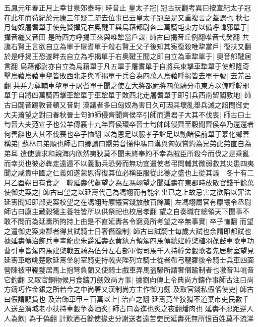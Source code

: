五鳳元年春正月上幸甘泉郊泰畤|{
	畤音止}
皇太子冠|{
	冠古玩翻考異曰按宣紀太子冠在此年而荀紀於元康三年疑二疏去位事已云皇太子冠至是又重複言之蓋誤也}
秋七月匈奴屠耆單于使先賢撣兄右奥鞬王與烏藉都尉各二萬騎屯東方以備呼韓邪單于|{
	撣音纒又音田}
是時西方呼揭王來與唯犂當戶謀|{
	師古曰揭音丘例翻唯音弋癸翻}
共讒右賢王言欲自立為單于屠耆單于殺右賢王父子後知其寃復殺唯犂當戶|{
	復扶又翻}
於是呼揭王恐遂畔去自立為呼揭單于右奧鞬王聞之即自立為車犂單于|{
	奧音郁鞬居言翻}
烏藉都尉亦自立為烏藉單于凡五單于屠耆單于自將兵東擊車犂單于使都隆奇擊烏藉烏藉車犂皆敗西北走與呼揭單于兵合為四萬人烏藉呼揭皆去單于號|{
	去羌呂翻}
共并力尊輔車犂單于屠耆單于聞之使左大將都尉將四萬騎分屯東方以備呼韓邪單于自將四萬騎西擊車犂單于車犂單于敗西北走屠耆單于即引兵西南留闒敦地|{
	師古曰闒音蹋敦音頓又音對}
漢議者多曰匈奴為害日久可因其壞亂舉兵滅之詔問御史大夫蕭望之對曰春秋晉士匄帥師侵齊聞齊侯卒引師而還君子大其不伐喪|{
	師古曰士匄晉大夫范宣子也公羊傳襄十九年齊侯環卒晉士匄帥師侵齊至穀聞齊侯卒乃還還者何善辭也大其不伐喪也卒子恤翻}
以為恩足以服孝子誼足以動諸侯前單于慕化鄉善稱弟|{
	蘇林曰弟順也師古曰郷讀曰嚮弟音悌仲馮曰漢與匈奴嘗約為兄弟此弟直自為弟耳}
遣使請求和親海内欣然夷狄莫不聞未終奉約不幸為賊臣所殺今而伐之是乘亂而幸災也彼必犇走遠遁不以義動兵恐勞而無功宜遣使者弔問輔其微弱救其災患四夷聞之咸貴中國之仁義如遂蒙恩得復其位必稱臣服從此德之盛也上從其議　冬十有二月乙酉朔日有食之　韓延夀代蕭望之為左馮翊望之聞延夀在東郡時放散官錢千餘萬使御史案之|{
	師古曰望之以延壽代己為馮翊而有能名出已之上故忌害之欲䧟以罪法}
延夀聞知即部吏案校望之在馮翊時廪犧官錢放散百餘萬|{
	左馮翊屬官有廪犧令丞尉師古曰廪主藏穀犧主養牲皆所以供祭祀也校居孝翻}
望之自奏職在總領天下聞事不敢不問而為延夀所拘持上由是不直延夀各令窮竟所考望之卒無事實|{
	卒子恤翻}
而望之遣御史案東郡者得其試騎士日奢僭踰制|{
	師古曰試騎士每歲大試也余謂即都試也據延夀傳治飾兵車畫龍虎朱爵延壽衣黄紈方領駕四馬傳總建幢棨植羽葆鼔車歌車功曹引車皆駕四馬建棨戟五騎為伍分左右部軍假司馬千人持幢旁轂歌者先居射室望見延夀車噭咷楚歌延夀坐射室騎吏持戟夾陛列立騎士從者帶弓鞬羅後令騎士兵車四面營陳被甲鞮鍪居馬上抱弩負蘭又使騎士戲車弄馬盗驂所謂奢僭踰制者也噭音叫咷音它釣翻}
又取官銅物候月食鑄刀劒效尚方事|{
	據劉向傳上令典尚方鑄作事師古注曰尚方鑄巧作金銀之所若今之中尚署又漢制尚方主作御刀劒}
及取官錢私假傜使吏|{
	師古曰假謂顧賃也}
及治飾車甲三百萬以上|{
	治直之翻}
延夀竟坐狡猾不道棄市吏民數千人送至渭城老小扶持車轂争奏酒炙|{
	師古曰奏進也炙之夜翻燔肉也}
延夀不忍距逆人人為飲|{
	為于偽翻}
計飲酒石餘使掾史分謝送者遠苦吏民延夀死無所恨百姓莫不流涕

